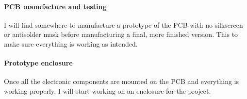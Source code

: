 \documentclass{article}
\begin{document}
\paragraph{PCB manufacture and testing}
I will find somewhere to manufacture a prototype of the PCB with no silkscreen or antisolder mask before manufacturing a final, more finished version. This to make sure everything is working as intended.

\paragraph{Prototype enclosure}
Once all the electronic components are mounted on the PCB and everything is working properly, I will start working on an enclosure for the project.
\end{document}
